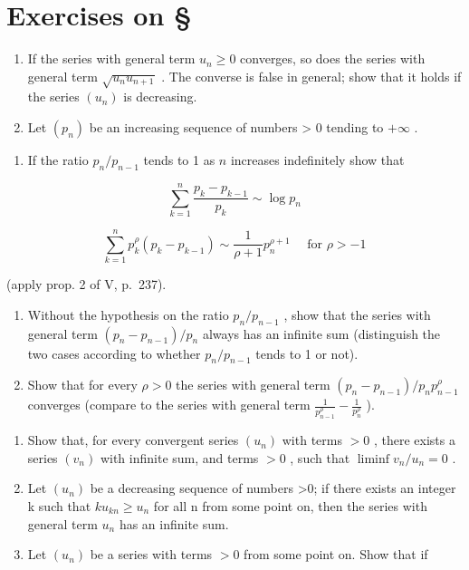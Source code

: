 \setcounter{exercisegroup}{3}
\section*{Exercises on \S{}}
{}

\begin{enumerate}
\def\labelenumi{\arabic{enumi})}
\item
  If the series with general term \(u_{n} \geqslant 0\) converges, so does the series with general term \(\sqrt{u_n u_{n+1}}\) . The converse is false in general; show that it holds if the series \((u_n)\) is decreasing.
\item
  Let \((p_{n})\) be an increasing sequence of numbers \textgreater{} 0 tending to \(+\infty\) .
\end{enumerate}

\begin{enumerate}
\def\labelenumi{\alph{enumi})}
\tightlist
\item
  If the ratio \(p_n / p_{n-1}\) tends to 1 as \(n\) increases indefinitely show that
\end{enumerate}

\[
\sum_ {k = 1} ^ {n} \frac {p _ {k} - p _ {k - 1}}{p _ {k}} \sim \log p _ {n}
\]

\[
\sum_ {k = 1} ^ {n} p _ {k} ^ {\rho} (p _ {k} - p _ {k - 1}) \sim \frac {1}{\rho + 1} p _ {n} ^ {\rho + 1} \quad \text { for } \rho > - 1
\]

(apply prop. 2 of V, p.~237).

\begin{enumerate}
\def\labelenumi{\alph{enumi})}
\setcounter{enumi}{1}
\item
  Without the hypothesis on the ratio \(p_{n}/p_{n-1}\) , show that the series with general term \((p_{n}-p_{n-1})/p_{n}\) always has an infinite sum (distinguish the two cases according to whether \(p_{n}/p_{n-1}\) tends to 1 or not).
\item
  Show that for every \(\rho > 0\) the series with general term \((p_n - p_{n-1}) / p_n p_{n-1}^\rho\) converges (compare to the series with general term \(\frac{1}{p_{n-1}^\rho} - \frac{1}{p_n^\rho}\) ).
\end{enumerate}

\begin{enumerate}
\def\labelenumi{\arabic{enumi})}
\setcounter{enumi}{2}
\item
  Show that, for every convergent series \((u_{n})\) with terms \(>0\) , there exists a series \((v_{n})\) with infinite sum, and terms \(>0\) , such that \(\liminf v_n / u_n = 0\) .
\item
  Let \((u_{n})\) be a decreasing sequence of numbers \textgreater0; if there exists an integer k such that \(ku_{kn} \geqslant u_{n}\) for all n from some point on, then the series with general term \(u_{n}\) has an infinite sum.
\item
  Let \((u_{n})\) be a series with terms \(>0\) from some point on. Show that if
\end{enumerate}

